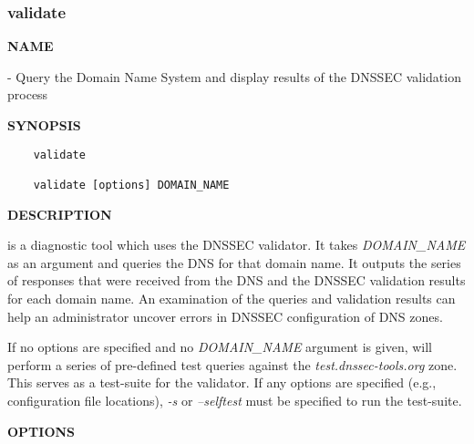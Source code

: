 \clearpage

\subsubsection{validate}

{\bf NAME}

 - Query the Domain Name System and display results of
the DNSSEC validation process

{\bf SYNOPSIS}

\begin{verbatim}
    validate

    validate [options] DOMAIN_NAME
\end{verbatim}

{\bf DESCRIPTION}

 is a diagnostic tool which uses the DNSSEC validator.  It
takes {\it DOMAIN\_NAME} as an argument and queries the DNS for that domain
name.  It outputs the series of responses that were received from the DNS and
the DNSSEC validation results for each domain name.  An examination of the
queries and validation results can help an administrator uncover errors in
DNSSEC configuration of DNS zones.

If no options are specified and no {\it DOMAIN\_NAME} argument is given,
 will perform a series of pre-defined test queries against the
{\it test.dnssec-tools.org} zone.  This serves as a test-suite for the
validator.  If any options are specified (e.g., configuration file locations),
{\it -s} or {\it --selftest} must be specified to run the test-suite.

{\bf OPTIONS}

